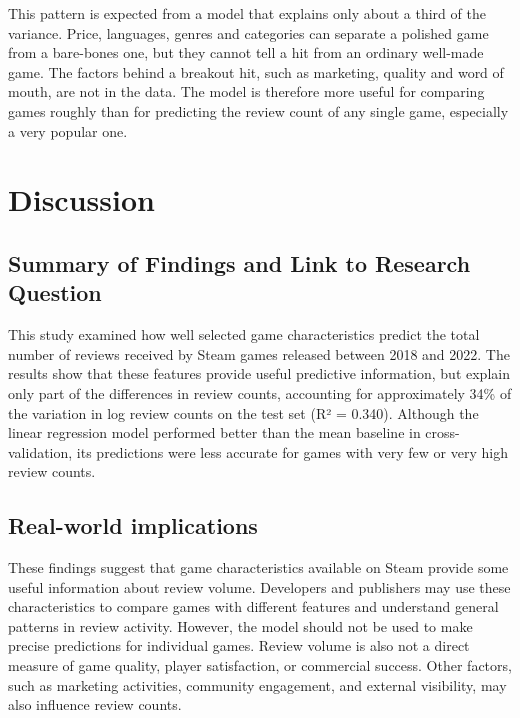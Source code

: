 \documentclass[
  letterpaper,
  DIV=11,
  numbers=noendperiod]{scrartcl}
\begin{document}
This pattern is expected from a model that explains only about a third
of the variance. Price, languages, genres and categories can separate a
polished game from a bare-bones one, but they cannot tell a hit from an
ordinary well-made game. The factors behind a breakout hit, such as
marketing, quality and word of mouth, are not in the data. The model is
therefore more useful for comparing games roughly than for predicting
the review count of any single game, especially a very popular one.

\section{Discussion}\label{discussion}

\subsection{Summary of Findings and Link to Research
Question}\label{summary-of-findings-and-link-to-research-question}

This study examined how well selected game characteristics predict the
total number of reviews received by Steam games released between 2018
and 2022. The results show that these features provide useful predictive
information, but explain only part of the differences in review counts,
accounting for approximately 34\% of the variation in log review counts
on the test set (R² = 0.340). Although the linear regression model
performed better than the mean baseline in cross-validation, its
predictions were less accurate for games with very few or very high
review counts.

\subsection{Real-world implications}\label{real-world-implications}

These findings suggest that game characteristics available on Steam
provide some useful information about review volume. Developers and
publishers may use these characteristics to compare games with different
features and understand general patterns in review activity. However,
the model should not be used to make precise predictions for individual
games. Review volume is also not a direct measure of game quality,
player satisfaction, or commercial success. Other factors, such as
marketing activities, community engagement, and external visibility, may
also influence review counts.
\end{document}
